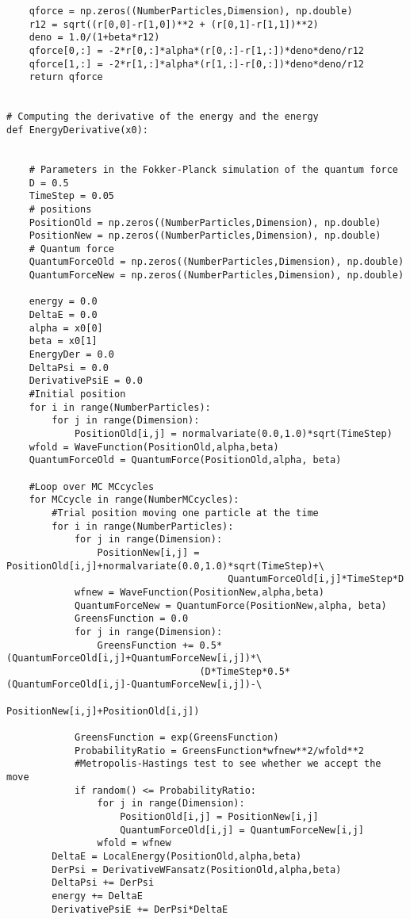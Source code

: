 \documentclass[%
oneside,                 %
final,                   %
10pt]{article}
\begin{document}
\begin{verbatim}
    qforce = np.zeros((NumberParticles,Dimension), np.double)
    r12 = sqrt((r[0,0]-r[1,0])**2 + (r[0,1]-r[1,1])**2)
    deno = 1.0/(1+beta*r12)
    qforce[0,:] = -2*r[0,:]*alpha*(r[0,:]-r[1,:])*deno*deno/r12
    qforce[1,:] = -2*r[1,:]*alpha*(r[1,:]-r[0,:])*deno*deno/r12
    return qforce
    

# Computing the derivative of the energy and the energy 
def EnergyDerivative(x0):

    
    # Parameters in the Fokker-Planck simulation of the quantum force
    D = 0.5
    TimeStep = 0.05
    # positions
    PositionOld = np.zeros((NumberParticles,Dimension), np.double)
    PositionNew = np.zeros((NumberParticles,Dimension), np.double)
    # Quantum force
    QuantumForceOld = np.zeros((NumberParticles,Dimension), np.double)
    QuantumForceNew = np.zeros((NumberParticles,Dimension), np.double)

    energy = 0.0
    DeltaE = 0.0
    alpha = x0[0]
    beta = x0[1]
    EnergyDer = 0.0
    DeltaPsi = 0.0
    DerivativePsiE = 0.0 
    #Initial position
    for i in range(NumberParticles):
        for j in range(Dimension):
            PositionOld[i,j] = normalvariate(0.0,1.0)*sqrt(TimeStep)
    wfold = WaveFunction(PositionOld,alpha,beta)
    QuantumForceOld = QuantumForce(PositionOld,alpha, beta)

    #Loop over MC MCcycles
    for MCcycle in range(NumberMCcycles):
        #Trial position moving one particle at the time
        for i in range(NumberParticles):
            for j in range(Dimension):
                PositionNew[i,j] = PositionOld[i,j]+normalvariate(0.0,1.0)*sqrt(TimeStep)+\
                                       QuantumForceOld[i,j]*TimeStep*D
            wfnew = WaveFunction(PositionNew,alpha,beta)
            QuantumForceNew = QuantumForce(PositionNew,alpha, beta)
            GreensFunction = 0.0
            for j in range(Dimension):
                GreensFunction += 0.5*(QuantumForceOld[i,j]+QuantumForceNew[i,j])*\
	                              (D*TimeStep*0.5*(QuantumForceOld[i,j]-QuantumForceNew[i,j])-\
                                      PositionNew[i,j]+PositionOld[i,j])
      
            GreensFunction = exp(GreensFunction)
            ProbabilityRatio = GreensFunction*wfnew**2/wfold**2
            #Metropolis-Hastings test to see whether we accept the move
            if random() <= ProbabilityRatio:
                for j in range(Dimension):
                    PositionOld[i,j] = PositionNew[i,j]
                    QuantumForceOld[i,j] = QuantumForceNew[i,j]
                wfold = wfnew
        DeltaE = LocalEnergy(PositionOld,alpha,beta)
        DerPsi = DerivativeWFansatz(PositionOld,alpha,beta)
        DeltaPsi += DerPsi
        energy += DeltaE
        DerivativePsiE += DerPsi*DeltaE
            

\end{verbatim}
\end{document}
